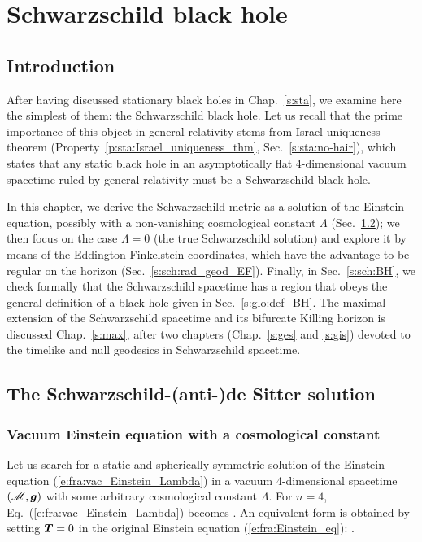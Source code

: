 \chapter{Schwarzschild black hole}
\label{s:sch}

\minitoc

\section{Introduction}

After having discussed stationary black holes in Chap.~\ref{s:sta},
we examine here the simplest of them: the Schwarzschild black hole.
Let us recall that the prime importance of this object
in general relativity stems from Israel uniqueness theorem
(Property~\ref{p:sta:Israel_uniqueness_thm}, Sec.~\ref{s:sta:no-hair}),
which states that any static black hole in an asymptotically flat 4-dimensional vacuum
spacetime ruled by general relativity must be a Schwarzschild black hole.

In this chapter, we derive the Schwarzschild metric as a solution of the
Einstein equation, possibly with a non-vanishing cosmological constant
$\Lambda$ (Sec.~\ref{s:sch:Sch_sol_lamb}); we then focus on the case $\Lambda=0$
(the true Schwarzschild solution) and explore it by means of the
Eddington-Finkelstein coordinates, which have
the advantage to be regular on the horizon (Sec.~\ref{s:sch:rad_geod_EF}).
Finally, in Sec.~\ref{s:sch:BH}, we check formally that the Schwarzschild spacetime has a region that obeys the general definition of a black hole given in
Sec.~\ref{s:glo:def_BH}. The maximal extension of the Schwarzschild
spacetime and its bifurcate Killing horizon
is discussed Chap.~\ref{s:max}, after two chapters (Chap.~\ref{s:ges} and \ref{s:gis})
devoted to the timelike and null geodesics in Schwarzschild
spacetime.

\section{The Schwarzschild-(anti-)de Sitter solution} \label{s:sch:Sch_sol_lamb}

\subsection{Vacuum Einstein equation with a cosmological constant}

Let us search for a static and spherically symmetric solution of the
Einstein equation (\ref{e:fra:vac_Einstein_Lambda}) in a vacuum
4-dimensional spacetime $(\mathscr{M},\bm{g})$ with some arbitrary cosmological constant
$\Lambda$. For $n=4$, Eq.~(\ref{e:fra:vac_Einstein_Lambda}) becomes
\be \label{e:sch:vac_Einstein_eq_Lamb}
     .
\ee
An equivalent form is obtained by setting $\bm{T}=0$
in the original Einstein equation (\ref{e:fra:Einstein_eq}):
\be \label{e:sch:vac_Einstein_eq}
     .
\ee

